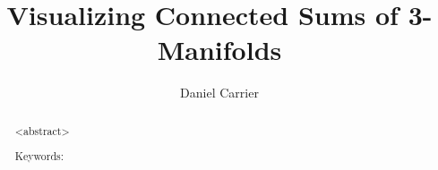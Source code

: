 \documentclass[12pt]{thesis}
\author{Daniel Carrier}
\title{Visualizing Connected Sums of 3-Manifolds}
\begin{document}
\frontmatter
\maketitle

\begin{abstract} %

<abstract>
  \vskip 3.25in
 
\noindent Keywords: %
\end{abstract}


\tableofcontents
\listoffigures

\mainmatter
\end{document}
